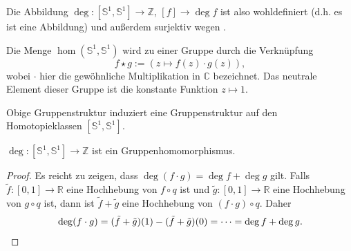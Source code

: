 \documentclass[
12pt, 
openany, 
a4paper, 
final,
fleqn, 
]{myclass}
\numberwithin{equation}{chapter}
\numberwithin{section}{chapter}
\newcommand{\ZZ}{\mathbb Z}
\newcommand{\RR}{\mathbb R}
\newcommand{\Ss}{\mathbb S}
\DeclareMathOperator{\id}{id}
\begin{document}

Die Abbildung $ \deg: [\mathbb{S}^{1}, \mathbb{S}^{1}]\to \mathbb{Z} $, $ [f]\to \deg f $ ist also wohldefiniert (d.h. es ist eine Abbildung) und außerdem surjektiv wegen .

Die Menge $ \hom(\mathbb{S}^{1}, \mathbb{S}^{1}) $ wird zu einer Gruppe durch die Verknüpfung
\[
f \star g :=(z\mapsto f(z)\cdot g(z)), 
\]
wobei $ \cdot $ hier die gewöhnliche Multiplikation in $ \mathbb{C} $ bezeichnet. Das neutrale Element dieser Gruppe ist die konstante Funktion $ z\mapsto 1 $. 
\begin{ex}\label{5.5}
Obige Gruppenstruktur induziert eine Gruppenstruktur auf den Homotopieklassen $ [\mathbb{S}^{1}, \mathbb{S}^{1}] $. 
\end{ex}

\begin{thr}\label{5.6}
$ \deg:[\mathbb{S}^{1}, \mathbb{S}^{1}] \to \mathbb{Z}$ ist ein Gruppenhomomorphismus. 
\end{thr}
\begin{proof}
Es reicht zu zeigen, dass $ \deg(f\cdot g) = \deg f + \deg g $ gilt. Falls $ \tilde f: [0,1]\to \mathbb{R} $ eine Hochhebung von $ f\circ q $ ist und $ \tilde g: [0,1]\to \mathbb{R} $ eine Hochhebung von $ g\circ q $ ist, dann ist $ \tilde f + \tilde g $ eine Hochhebung von $ (f\cdot g) \circ q $. 
Daher
\[ 
\deg (f\cdot g) = (\tilde f + \tilde g)(1) - (\tilde f + \tilde g)(0) = \dots = \deg f + \deg g. \qedhere
\]
\end{proof}
\end{document}
